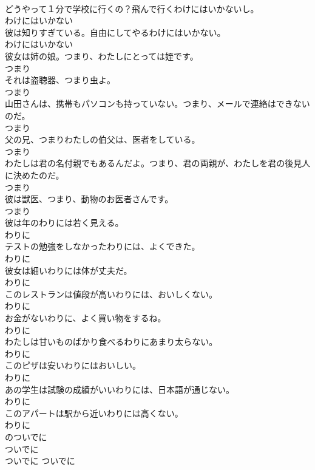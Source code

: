 \documentclass[8pt]{extreport}
\begin{document}
\begin{CJK}{UTF8}{min}
\\	どうやって１分で学校に行くの？飛んで行くわけにはいかないし。	
\\	わけにはいかない
\\	彼は知りすぎている。自由にしてやるわけにはいかない。	
\\	わけにはいかない
\\	彼女は姉の娘。つまり、わたしにとっては姪です。	
\\	つまり
\\	それは盗聴器、つまり虫よ。	
\\	つまり
\\	山田さんは、携帯もパソコンも持っていない。つまり、メールで連絡はできないのだ。	
\\	つまり
\\	父の兄、つまりわたしの伯父は、医者をしている。	
\\	つまり
\\	わたしは君の名付親でもあるんだよ。つまり、君の両親が、わたしを君の後見人に決めたのだ。	
\\	つまり
\\	彼は獣医、つまり、動物のお医者さんです。	
\\	つまり
\\	彼は年のわりには若く見える。	
\\	わりに
\\	テストの勉強をしなかったわりには、よくできた。	
\\	わりに
\\	彼女は細いわりには体が丈夫だ。	
\\	わりに
\\	このレストランは値段が高いわりには、おいしくない。	
\\	わりに
\\	お金がないわりに、よく買い物をするね。	
\\	わりに
\\	わたしは甘いものばかり食べるわりにあまり太らない。	
\\	わりに
\\	このピザは安いわりにはおいしい。	
\\	わりに
\\	あの学生は試験の成績がいいわりには、日本語が通じない。	
\\	わりに
\\	このアパートは駅から近いわりには高くない。	
\\	わりに
\\	のついでに	
\\	ついでに	
\\	ついでに	ついでに

\end{CJK}
\end{document}
